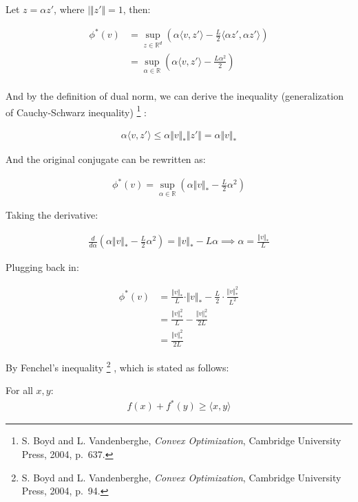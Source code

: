 \documentclass{article}
\begin{document}
Let $z = \alpha z'$, where $|\Vert z'\Vert = 1$, then:

\begin{align*}
    \phi^*(v) 
    &= \sup_{z \in \mathbb{R}^d} \left( \alpha \langle v, z' \rangle - \frac{L}{2} \langle \alpha z', \alpha z' \rangle \right) \\
    &= \sup_{\alpha \in \mathbb{R}} \left( \alpha \langle v, z' \rangle - \frac{L \alpha^2}{2} \right) \\
\end{align*}

And by the definition of dual norm, we can derive the inequality (generalization of Cauchy-Schwarz inequality)
\footnote{S. Boyd and L. Vandenberghe, \textit{Convex Optimization}, Cambridge University Press, 2004, p.~637.}
:

\begin{align*}
    \alpha \langle v, z' \rangle \leq \alpha \Vert v \Vert_* \Vert z' \Vert = \alpha \Vert v \Vert_*
\end{align*}

And the original conjugate can be rewritten as:

\begin{align*}
    \phi^*(v) = \sup_{\alpha \in \mathbb{R}} \left( \alpha \Vert v \Vert_* - \frac{L}{2} \alpha^2 \right)
\end{align*}

Taking the derivative:

\begin{align*}
    \frac{d}{d\alpha} \left( \alpha \Vert v \Vert_* - \frac{L}{2} \alpha^2 \right) = \Vert v \Vert_* - L \alpha 
    \implies \alpha = \frac{\Vert v \Vert_*}{L}
\end{align*}

Plugging back in:

\begin{align*}
    \phi^*(v) 
    &= \frac{\Vert v \Vert_*}{L} \cdot \Vert v \Vert_* - \frac{L}{2} \cdot \frac{\Vert v \Vert_*^2}{L^2} \\
    &= \frac{\Vert v \Vert_*^2}{L} - \frac{\Vert v \Vert_*^2}{2L} \\
    &= \frac{\Vert v \Vert_*^2}{2L}
\end{align*}


By Fenchel's inequality
\footnote{S. Boyd and L. Vandenberghe, \textit{Convex Optimization}, Cambridge University Press, 2004, p.~94.}
, which is stated as follows:

\begin{tcolorbox}[greenbox, title = Fenchel's inequality]
    For all $x, y$:
    \begin{align*}
        f(x) + f^*(y) \geq \langle x, y \rangle
    \end{align*}
\end{tcolorbox}
\end{document}
